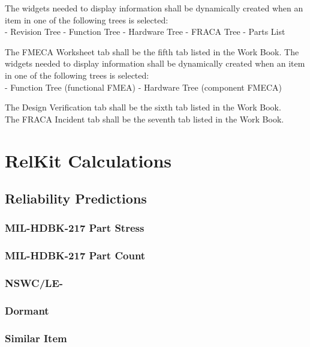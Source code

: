 \documentclass[11pt, 12pt, twoside, onecolumn]{article}
\begin{document}
The widgets needed to display information shall be dynamically created when an item in one of the following trees is selected: \\

    - Revision Tree
    - Function Tree
    - Hardware Tree
    - FRACA Tree
    - Parts List

\noindent The FMECA Worksheet tab shall be the fifth tab listed in the Work Book.  The widgets needed to display information shall be dynamically created when an item in one of the following trees is selected: \\

    - Function Tree (functional FMEA)
    - Hardware Tree (component FMECA)

\noindent The Design Verification tab shall be the sixth tab listed in the Work Book. \\

\noindent The FRACA Incident tab shall be the seventh tab listed in the Work Book. \\

\section{\bf \Large RelKit Calculations}

\subsection{\bf \large Reliability Predictions}

\subsubsection{\bf MIL-HDBK-217 Part Stress}
\subsubsection{\bf MIL-HDBK-217 Part Count}
\subsubsection{\bf NSWC/LE-}
\subsubsection{\bf Dormant}
\subsubsection{\bf Similar Item}
\end{document}
